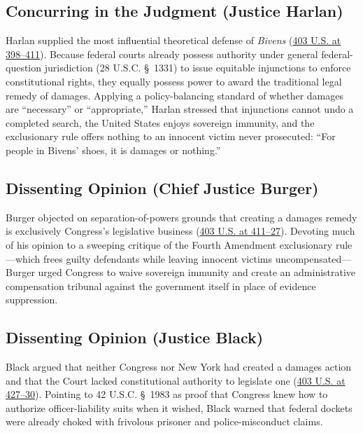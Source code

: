 \documentclass[12pt]{article}
\begin{document}
\subsection{Concurring in the Judgment (Justice Harlan)}

Harlan supplied the most influential theoretical defense of \textit{Bivens} (\href{https://supreme.justia.com/cases/federal/us/403/388/}{403 U.S. at 398--411}). Because federal courts already possess authority under general federal-question jurisdiction (28 U.S.C. \S~1331) to issue equitable injunctions to enforce constitutional rights, they equally possess power to award the traditional legal remedy of damages. Applying a policy-balancing standard of whether damages are ``necessary'' or ``appropriate,'' Harlan stressed that injunctions cannot undo a completed search, the United States enjoys sovereign immunity, and the exclusionary rule offers nothing to an innocent victim never prosecuted: ``For people in Bivens' shoes, it is damages or nothing.''

\subsection{Dissenting Opinion (Chief Justice Burger)}

Burger objected on separation-of-powers grounds that creating a damages remedy is exclusively Congress's legislative business (\href{https://supreme.justia.com/cases/federal/us/403/388/}{403 U.S. at 411--27}). Devoting much of his opinion to a sweeping critique of the Fourth Amendment exclusionary rule---which frees guilty defendants while leaving innocent victims uncompensated---Burger urged Congress to waive sovereign immunity and create an administrative compensation tribunal against the government itself in place of evidence suppression.

\subsection{Dissenting Opinion (Justice Black)}

Black argued that neither Congress nor New York had created a damages action and that the Court lacked constitutional authority to legislate one (\href{https://supreme.justia.com/cases/federal/us/403/388/}{403 U.S. at 427--30}). Pointing to 42 U.S.C. \S~1983 as proof that Congress knew how to authorize officer-liability suits when it wished, Black warned that federal dockets were already choked with frivolous prisoner and police-misconduct claims.
\end{document}
